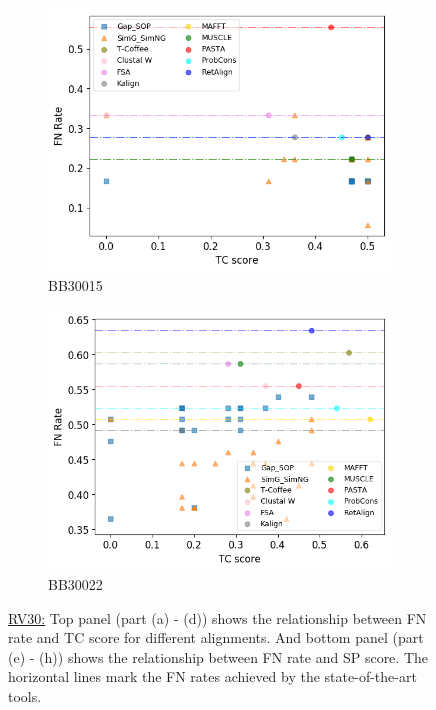 \begin{figure}[!htbp]
\begin{adjustwidth}{-1cm}{-1cm}
		\begin{subfigure}{0.22\textwidth}
			\includegraphics[width=\columnwidth]{Figure/summary/precomputedInit/Balibase/BB30015_fnrate_vs_tc_2}
			\caption{BB30015}
		\end{subfigure}
		\begin{subfigure}{0.22\textwidth}
			\includegraphics[width=\columnwidth]{Figure/summary/precomputedInit/Balibase/BB30022_fnrate_vs_tc_2}
			\caption{BB30022}
		\end{subfigure}	
		\caption{\underline{RV30:} Top panel (part (a) - (d)) shows the relationship between FN rate and TC score for different alignments. And bottom panel (part (e) - (h)) shows the relationship between FN rate and SP score. The horizontal lines mark the FN rates achieved by the state-of-the-art tools.}
		\label{fig:rv30_fnrate_vs_tc}
	\end{adjustwidth}
\end{figure}
